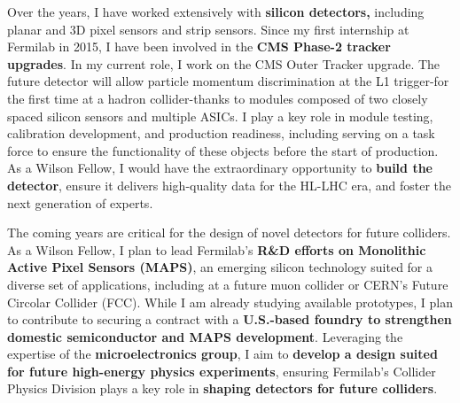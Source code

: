 {\begin{flushleft}
Over the years, I have worked extensively with {\bf silicon detectors,} including planar and 3D pixel sensors and strip sensors. Since my first internship at Fermilab in 2015, I have been involved in the {\bf CMS Phase-2 tracker upgrades}. In my current role, I work on the CMS Outer Tracker upgrade. The future detector will allow particle momentum discrimination at the L1 trigger-for the first time at a hadron collider-thanks to modules composed of two closely spaced silicon sensors and multiple ASICs. I play a key role in module testing, calibration development, and production readiness, including serving on a task force to ensure the functionality of these objects before the start of production. As a Wilson Fellow, I would have the extraordinary opportunity to {\bf build the detector}, ensure it delivers high-quality data for the HL-LHC era, and foster the next generation of experts.

The coming years are critical for the design of novel detectors for future colliders. As a Wilson Fellow, I plan to lead Fermilab’s {\bf R\&D efforts on Monolithic Active Pixel Sensors (MAPS)}, an emerging silicon technology suited for a diverse set of applications, including at a future muon collider or CERN's Future Circolar Collider (FCC). While I am already studying available prototypes, I plan to contribute to securing a contract with a {\bf U.S.-based foundry to strengthen domestic semiconductor and MAPS development}. Leveraging the expertise of the {\bf microelectronics group}, I aim to {\bf develop a design suited for future high-energy physics experiments}, ensuring Fermilab’s Collider Physics Division plays a key role in {\bf shaping detectors for future colliders}.



\end{flushleft}}
